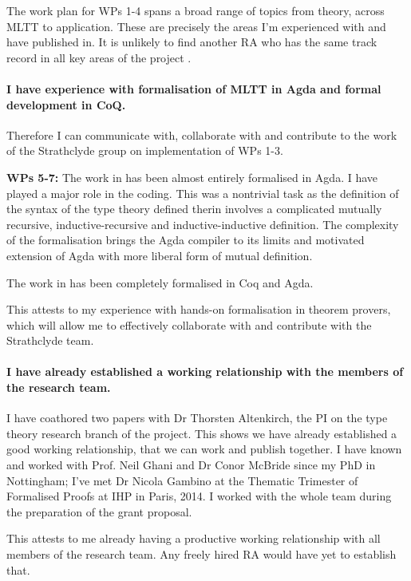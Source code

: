 \documentclass[a4paper]{article}
\newcommand{\mltt}{MLTT}
\begin{document}
The work plan for WPs 1-4 spans a broad range of topics from theory,
across {\mltt} to application. These are precisely the areas I'm
experienced with and have published in.  It is unlikely to find
another RA who has the same track record in all key areas of the
project .

\paragraph{I have experience with formalisation of {\mltt} in Agda and
  formal development in CoQ.} Therefore I can communicate with, collaborate
with and contribute to the work of the Strathclyde group on
implementation of WPs 1-3.

{\bf WPs 5-7:} The work in
 has been almost
entirely formalised in Agda. I have played a major role in the
coding. This was a nontrivial task as the definition of the syntax of
the type theory defined therin involves a complicated mutually
recursive, inductive-recursive and inductive-inductive definition. The
complexity of the formalisation brings the Agda compiler to its limits
and motivated extension of Agda with more liberal form of mutual
definition.

The work in  has been completely
formalised in Coq and Agda.  

This attests to my experience with hands-on formalisation in theorem
provers, which will allow me to effectively collaborate with and
contribute with the Strathclyde team. 
  

\paragraph{I have already established a working relationship with the
  members of the research team.} I have coathored two papers with Dr
Thorsten Altenkirch, the PI on the type theory research branch of the
project. This shows we have already established a good working
relationship, that we can work and publish together. I have known and
worked with Prof. Neil Ghani and Dr Conor McBride since my PhD in
Nottingham; I've met Dr Nicola Gambino at the Thematic Trimester of
Formalised Proofs at IHP in Paris, 2014. I worked with the whole team
during the preparation of the grant proposal.

This attests to me already having a productive working relationship
with all members of the research team. Any freely hired RA would have
yet to establish that.
\end{document}
